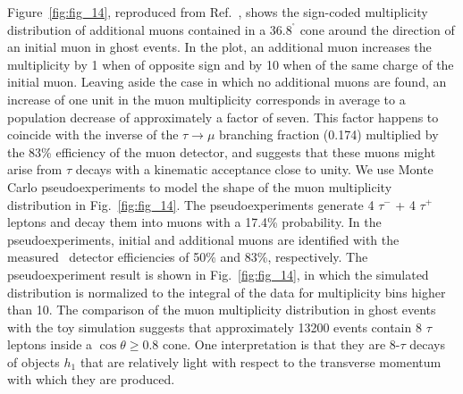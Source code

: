 \documentclass[twocolumn,10pt,prl,preprint,floatfix,nofootinbib,superscriptaddress,showpacs,amssymb]{revtex4}
\def\deg{^\circ}
\begin{document}
 Figure~\ref{fig:fig_14}, reproduced from Ref.~\cite{a0disc}, shows the
 sign-coded multiplicity distribution of additional muons contained in a
 $36.8^{\deg}$ cone around the direction of an initial muon in ghost 
 events. In the plot, an additional muon increases the multiplicity by 1
 when of opposite sign and by 10 when of the same charge of the initial muon.
 Leaving aside the case in which no additional muons are found, an increase
 of one unit in the muon multiplicity corresponds in average to a population
 decrease of approximately a factor of seven. This factor happens to coincide
 with the inverse of the $\tau \rightarrow \mu$ branching fraction (0.174)
 multiplied by the 83\% efficiency of the muon detector, and suggests
 that these muons might arise from $\tau$ decays with
 a kinematic acceptance close to unity. We use Monte Carlo pseudoexperiments
 to model the shape of the muon multiplicity distribution in 
 Fig.~\ref{fig:fig_14}. The pseudoexperiments generate 4 $\tau^-$ + 4 $\tau^+$
 leptons and decay them into muons with a 17.4\% probability. In the
 pseudoexperiments, initial and additional muons are identified with the
 measured~\cite{a0disc} detector efficiencies of 50\% and 83\%, respectively.
 The pseudoexperiment result is shown in Fig.~\ref{fig:fig_14}, in which the
 simulated distribution is normalized to the integral of the data for
 multiplicity bins higher than 10. The comparison of the muon multiplicity
 distribution in ghost events with the toy simulation suggests that
 approximately 13200 events contain 8 $\tau$ leptons inside a
 $\cos \theta \geq 0.8$ cone. One interpretation is that they are
 8-$\tau$ decays of objects $h_1$ that are relatively light with 
 respect to the transverse momentum with which they are produced.
\end{document}
